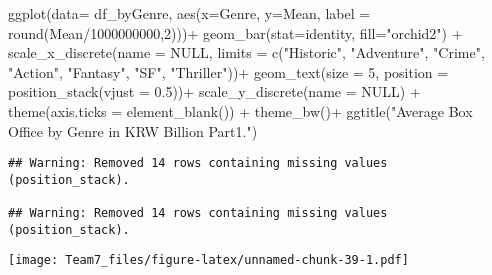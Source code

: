 \documentclass[
]{article}
\newenvironment{Shaded}{\begin{snugshade}}{\end{snugshade}}
\newcommand{\AttributeTok}[1]{\textcolor[rgb]{0.77,0.63,0.00}{#1}}
\newcommand{\ConstantTok}[1]{\textcolor[rgb]{0.00,0.00,0.00}{#1}}
\newcommand{\DecValTok}[1]{\textcolor[rgb]{0.00,0.00,0.81}{#1}}
\newcommand{\FloatTok}[1]{\textcolor[rgb]{0.00,0.00,0.81}{#1}}
\newcommand{\FunctionTok}[1]{\textcolor[rgb]{0.00,0.00,0.00}{#1}}
\newcommand{\NormalTok}[1]{#1}
\newcommand{\SpecialCharTok}[1]{\textcolor[rgb]{0.00,0.00,0.00}{#1}}
\newcommand{\StringTok}[1]{\textcolor[rgb]{0.31,0.60,0.02}{#1}}
\begin{document}
\begin{Shaded}
\begin{Highlighting}[]
\FunctionTok{ggplot}\NormalTok{(}\AttributeTok{data=}\NormalTok{ df\_byGenre, }\FunctionTok{aes}\NormalTok{(}\AttributeTok{x=}\NormalTok{Genre, }\AttributeTok{y=}\NormalTok{Mean, }
      \AttributeTok{label =} \FunctionTok{round}\NormalTok{(Mean}\SpecialCharTok{/}\DecValTok{1000000000}\NormalTok{,}\DecValTok{2}\NormalTok{)))}\SpecialCharTok{+}
  \FunctionTok{geom\_bar}\NormalTok{(}\AttributeTok{stat=}\StringTok{\textquotesingle{}identity\textquotesingle{}}\NormalTok{, }\AttributeTok{fill=}\StringTok{"orchid2"}\NormalTok{) }\SpecialCharTok{+}
  \FunctionTok{scale\_x\_discrete}\NormalTok{(}\AttributeTok{name =} \ConstantTok{NULL}\NormalTok{, }
                   \AttributeTok{limits =} \FunctionTok{c}\NormalTok{(}\StringTok{"Historic"}\NormalTok{, }\StringTok{"Adventure"}\NormalTok{, }\StringTok{"Crime"}\NormalTok{, }\StringTok{"Action"}\NormalTok{, }\StringTok{"Fantasy"}\NormalTok{, }\StringTok{"SF"}\NormalTok{, }\StringTok{"Thriller"}\NormalTok{))}\SpecialCharTok{+}
  \FunctionTok{geom\_text}\NormalTok{(}\AttributeTok{size =} \DecValTok{5}\NormalTok{, }\AttributeTok{position =} \FunctionTok{position\_stack}\NormalTok{(}\AttributeTok{vjust =} \FloatTok{0.5}\NormalTok{))}\SpecialCharTok{+}
  \FunctionTok{scale\_y\_discrete}\NormalTok{(}\AttributeTok{name =} \ConstantTok{NULL}\NormalTok{) }\SpecialCharTok{+}
  \FunctionTok{theme}\NormalTok{(}\AttributeTok{axis.ticks =} \FunctionTok{element\_blank}\NormalTok{()) }\SpecialCharTok{+}
  \FunctionTok{theme\_bw}\NormalTok{()}\SpecialCharTok{+}
  \FunctionTok{ggtitle}\NormalTok{(}\StringTok{"Average Box Office by Genre in KRW Billion Part1."}\NormalTok{)}
\end{Highlighting}
\end{Shaded}

\begin{verbatim}
## Warning: Removed 14 rows containing missing values (position_stack).

## Warning: Removed 14 rows containing missing values (position_stack).
\end{verbatim}

\texttt{[image: Team7\_files/figure-latex/unnamed-chunk-39-1.pdf]}
\end{document}
